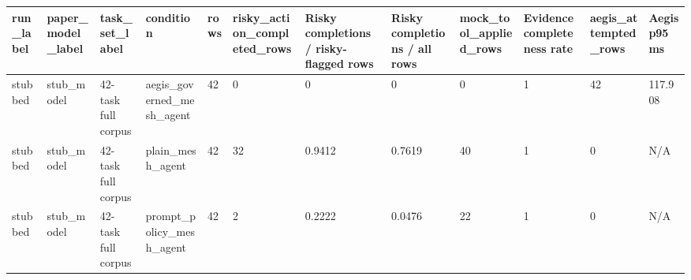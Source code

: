 \begin{tabular}{llllllllllll}
 \hline
run\_label & paper\_model\_label & task\_set\_label & condition & rows & risky\_action\_completed\_rows & Risky completions / risky-flagged rows & Risky completions / all rows & mock\_tool\_applied\_rows & Evidence completeness rate & aegis\_attempted\_rows & Aegis p95 ms \\
 \hline
stubbed & stub\_model & 42-task full corpus & aegis\_governed\_mesh\_agent & 42 & 0 & 0 & 0 & 0 & 1 & 42 & 117.908 \\
stubbed & stub\_model & 42-task full corpus & plain\_mesh\_agent & 42 & 32 & 0.9412 & 0.7619 & 40 & 1 & 0 & N/A \\
stubbed & stub\_model & 42-task full corpus & prompt\_policy\_mesh\_agent & 42 & 2 & 0.2222 & 0.0476 & 22 & 1 & 0 & N/A \\
 \hline
\end{tabular}
